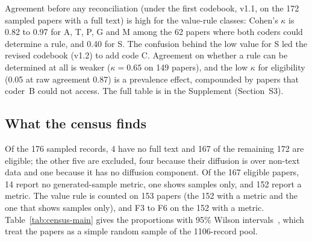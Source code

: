 Agreement before any reconciliation (under the first codebook, v1.1, on the 172 sampled papers with a full text) is high for the value-rule classes: Cohen's $\kappa$ is 0.82 to 0.97 for A, T, P, G and M among the 62 papers where both coders could determine a rule, and 0.40 for S. The confusion behind the low value for S led the revised codebook (v1.2) to add code C. Agreement on whether a rule can be determined at all is weaker ($\kappa=0.65$ on 149 papers), and the low $\kappa$ for eligibility (0.05 at raw agreement 0.87) is a prevalence effect, compounded by papers that coder~B could not access. The full table is in the Supplement (Section~S3).

\subsection{What the census finds}
\label{sec:census-results}

Of the 176 sampled records, 4 have no full text and 167 of the remaining 172 are eligible; the other five are excluded, four because their diffusion is over non-text data and one because it has no diffusion component. Of the 167 eligible papers, 14 report no generated-sample metric, one shows samples only, and 152 report a metric. %
The value rule is counted on 153 papers (the 152 with a metric and the one that shows samples only), and F3 to F6 on the 152 with a metric. Table~\ref{tab:census-main} gives the proportions with 95\% Wilson intervals~\cite{wilson1927probable}, which treat the papers as a simple random sample of the 1106-record pool. %

